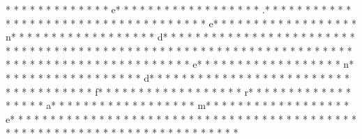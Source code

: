 *  * * *  *  * * *  *  * * *  * e* * *  * * *  * * *  *  * * *  *  * * *  * .* * *  * * *  * * *  *  * * *  *  * * *  * 
* * *  * * *  * * *  *  * * *  *  * * *  * e* * *  * * *  * * *  *  * * *  *  * * *  * n* * *  * * *  * * *  *  * * *  *  * * *  * d* * *  * * *  * * *  *  * * *  *  * * *  * {* * *  * * *  * * *  *  * * *  *  * * *  *  * * *  * * *  * * *  *  * * *  *  * * *  * }* * *  * * *  * * *  *  * * *  *  * * *  * 
* * *  * * *  * * *  *  * * *  *  * * *  * e* * *  * * *  * * *  *  * * *  *  * * *  * n* * *  * * *  * * *  *  * * *  *  * * *  * d* * *  * * *  * * *  *  * * *  *  * * *  * {* * *  * * *  * * *  *  * * *  *  * * *  * f* * *  * * *  * * *  *  * * *  *  * * *  * r* * *  * * *  * * *  *  * * *  *  * * *  * a* * *  * * *  * * *  *  * * *  *  * * *  * m* * *  * * *  * * *  *  * * *  *  * * *  * e* * *  * * *  * * *  *  * * *  *  * * *  * }* * *  * * *  * * *  *  * * *  *  * * *  * 
* * *  * * *  * * *  *  * * *  *  * * *  * 
* * *  * * *  * * *  *  * * *  *  * * *  * %

